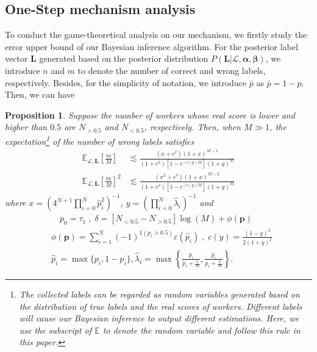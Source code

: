 \documentclass{article}
\makeatletter
\newtheorem{proposition}[theorem]{Proposition}
\renewenvironment{proof}[1][\proofname]{\par
  \vspace{-\topsep}%
  \pushQED{\qed}%
  \normalfont
  \topsep0pt \partopsep0pt %
  \trivlist
  \item[\hskip\labelsep
        \itshape
    #1\@addpunct{.}]\ignorespaces
}{%
  \popQED\endtrivlist\@endpefalse
  \addvspace{0pt plus 0pt} %
}
\makeatother
\begin{document}
\subsection{One-Step mechanism analysis}
To conduct the game-theoretical analysis on our mechanism, we firstly study the error upper bound of our Bayesian inference algorithm.
For the posterior label vector $\bm{L}$ generated based on the posterior distribution $P(\bm{L}|\mathcal{L},\bm{\alpha}, \bm{\beta})$, we introduce $n$ and $m$ to denote the number of correct and wrong labels, respectively.
Besides, for the simplicity of notation, we introduce $\bar{p}$ as $\bar{p}=1-p$.
Then, we can have
\begin{proposition}
\label{ConvBound}
Suppose the number of workers whose real score is lower and higher than $0.5$ are $N_{>0.5}$ and $N_{<0.5}$, respectively.
Then, when $M\gg 1$, the expectation\footnote{The collected labels can be regarded as random variables generated based on the distribution of true labels and the real scores of workers. Different labels will cause our Bayesian inference to output different estimations. Here, we use the subscript of $\mathbb{E}$ to denote the random variable and follow this rule in this paper.} of the number of wrong labels satisfies
\begin{equation*}
\begin{split}
\mathbb{E}_{\mathcal{L},\bm{L}}\left[\frac{m}{M}\right]&\lesssim \frac{(x+e^{\delta})(1+x)^{M-1}}{(1+e^{\delta})[1-e^{-c(y)M}](1+y)^{M}}\\
\mathbb{E}_{\mathcal{L},\bm{L}}\left[\frac{m}{M}\right]^2&\lesssim \frac{(x^2+e^{\delta})(1+x)^{M-2}}{(1+e^{\delta})[1-e^{-c(y)M}](1+y)^{M}}
\end{split}
\end{equation*}
where $x=\left(4^{N+1}\prod_{i=0}^{N}\hat{p}^{2}_i\right)^{-1}$, $y=\left(\prod_{i=0}^{N}\hat{\lambda}_{i}\right)^{-1}$ and
\begin{equation*}
\begin{split}
&\quad p_0=\tau_1\;,\;\delta = [N_{<0.5}-N_{>0.5}]\log(M)+\phi(\bm{p})\\
&\phi(\bm{p})={\sum}_{i=1}^{N}(-1)^{1(p_i>0.5)}\varepsilon(\hat{p}_i)\;,\; c(y)=\frac{(1-y)^2}{2(1+y)^{2}}\\
&\hat{p}_i=\max\{p_i, 1-p_i\}, \hat{\lambda}_i=\max\left\{\frac{p_i}{\bar{p}_i+\frac{1}{M}},\frac{\bar{p}_i}{p_i+\frac{1}{M}}\right\}.
\end{split}
\end{equation*}
\begin{proof}

\end{proof}
\end{proposition}
\end{document}
